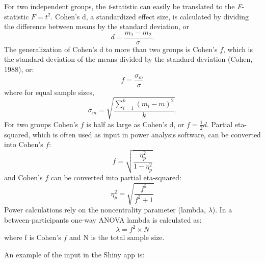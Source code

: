 \documentclass[
  ,jou,floatsintext]{apa6}
\begin{document}
\begin{tcolorbox}[colback=black!5!white,colframe=white!5!black,title=Box 1. Formula for effect sizes for ANOVA designs]
For two independent groups, the \textit{t}-statistic can easily be translated to the \textit{F}-statistic $F = t^2$.
Cohen's d, a standardized effect size, is calculated by dividing the difference between means by the standard deviation, or 
\begin{equation}
d = \frac{m_1-m_2}{\sigma}.
\end{equation}
The generalization of Cohen's d to more than two groups is Cohen's $f$, which is the standard deviation of the means divided by the standard deviation (Cohen, 1988), or: 
\begin{equation}
f = \frac{\sigma _{ m }}{\sigma}
\end{equation}
where for equal sample sizes,
\begin{equation}
\sigma _{ m } = \sqrt { \frac { \sum_ { i = 1 } ^ { k } ( m _ { i } - m ) ^ { 2 } } { k } }.
\end{equation}
For two groups Cohen's $f$ is half as large as Cohen's d, or $f = \frac{1}{2}d$.
Partial eta-squared, which is often used as input in power analysis software, can be converted into Cohen's $f$:
\begin{equation}
f = \sqrt{\frac{\eta_p^2}{1-\eta_p^2}} \label{eq:eta-to-f}
\end{equation}
and Cohen's $f$ can be converted into partial eta-squared:
\begin{equation}
\eta_p^2 = \sqrt{\frac{f^2}{f^2+1}} \label{eq:f-to-eta}
\end{equation}
Power calculations rely on the noncentrality parameter (lambda, $\lambda$).
In a between-participants one-way ANOVA lambda is calculated as:
\begin{equation}
\lambda = f^2 \times N \label{eq:lambda}
\end{equation}
where f is Cohen's $f$ and N is the total sample size. 
\end{tcolorbox}

An example of the input in the Shiny app is:
\end{document}
